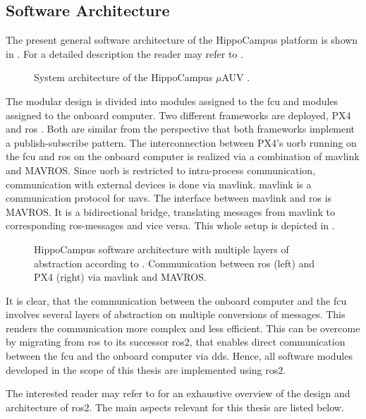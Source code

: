 \subsection{Software Architecture}
The present general software architecture of the HippoCampus platform is shown in . For a detailed description the reader may refer to \cite{duecker-phd}. 
\begin{figure}[h!]
	\centering
     \def\svgwidth{12cm}  
	
	\caption{System architecture of the HippoCampus $\mu$AUV \cite{duecker-phd}.}
    \label{fig:software-architecture-overview}
\end{figure}
The modular design is divided into modules assigned to the \ac{fcu} and modules assigned to the onboard computer.
Two different frameworks are deployed, PX4 \cite{PX4} and \ac{ros} \cite{ros}.
Both are similar from the perspective that both frameworks implement a publish-subscribe pattern.
The interconnection between PX4's \ac{uorb} running on the \ac{fcu} and \ac{ros} on the onboard computer is realized via a combination of \ac{mavlink} \cite{mavlink} and MAVROS.
Since \ac{uorb} is restricted to intra-process communication, communication with external devices is done via \ac{mavlink}.
\ac{mavlink} is a communication protocol for \acp{uav}.
The interface between \ac{mavlink} and \ac{ros} is MAVROS. It is a bidirectional bridge, translating messages from \ac{mavlink} to corresponding \acs{ros}-messages and vice versa. This whole setup is depicted in .
\begin{figure}[h!]
	\centering
    \def\svgwidth{12cm}  
	
	\caption{HippoCampus software architecture with multiple layers of abstraction according to \cite{duecker-phd}. Communication between \acs{ros} (left) and PX4 (right) via \acs{mavlink} and MAVROS.}
    \label{fig:ros-px4-communication}
\end{figure}
It is clear, that the communication between the onboard computer and the \ac{fcu} involves several layers of abstraction on multiple conversions of messages. This renders the communication more complex and less efficient. This can be overcome by migrating from \ac{ros} to its successor \ac{ros2}, that enables direct communication between the \ac{fcu} and the onboard computer via \ac{dds}. Hence, all software modules developed in the scope of this thesis are implemented using \ac{ros2}.

The interested reader may refer to \cite{ros2} for an exhaustive overview of the design and architecture of \ac{ros2}. The main aspects relevant for this thesis are listed below.

